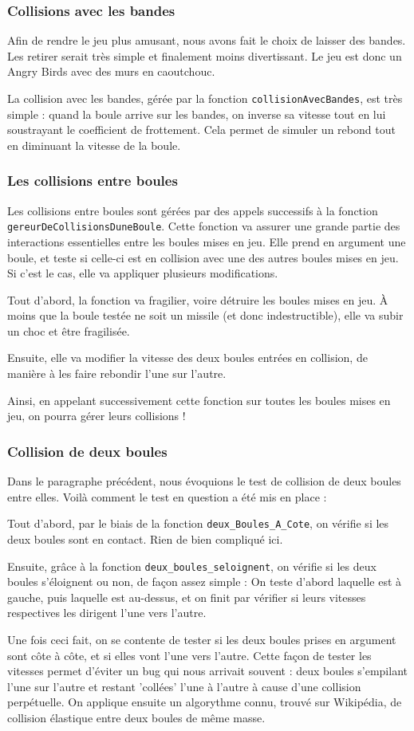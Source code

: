 \documentclass[10pt]{article}
\begin{document}
\subsubsection{Collisions avec les bandes}
Afin de rendre le jeu plus amusant, nous avons fait le choix de laisser des bandes. Les retirer serait très simple et finalement moins
divertissant. Le jeu est donc un Angry Birds avec des murs en caoutchouc.
\par La collision avec les bandes, gérée par la fonction \texttt{collisionAvecBandes}, est très simple : quand la boule arrive sur les bandes, on inverse sa vitesse tout en lui soustrayant
le coefficient de frottement. Cela permet de simuler un rebond tout en diminuant la vitesse de la boule.
\subsubsection{Les collisions entre boules}
Les collisions entre boules sont gérées par des appels successifs à la fonction \texttt{gereurDeCollisionsDuneBoule}. Cette fonction va
assurer une grande partie des interactions essentielles entre les boules mises en jeu. Elle prend en argument une boule, et teste si
celle-ci est en collision avec une des autres boules mises en jeu. Si c'est le cas, elle va appliquer plusieurs modifications.
\par Tout d'abord, la fonction va fragilier, voire détruire les boules mises en jeu. À moins que la boule testée ne soit un missile
(et donc indestructible), elle va subir un choc et être fragilisée.
\par Ensuite, elle va modifier la vitesse des deux boules entrées en collision, de manière à les faire rebondir l'une sur l'autre.
\par Ainsi, en appelant successivement cette fonction sur toutes les boules mises en jeu, on pourra gérer leurs collisions !
\subsubsection{Collision de deux boules}
Dans le paragraphe précédent, nous évoquions le test de collision de deux boules entre elles. Voilà comment le test en question a été mis en place :
\par Tout d'abord, par le biais de la fonction \texttt{deux\_Boules\_A\_Cote}, on vérifie si les deux boules sont en contact. Rien de bien compliqué ici.
\par Ensuite, grâce à la fonction \texttt{deux\_boules\_seloignent}, on vérifie si les deux boules s'éloignent ou non, de façon assez simple :
On teste d'abord laquelle est à gauche, puis laquelle est au-dessus, et on finit par vérifier si leurs vitesses respectives les dirigent l'une vers l'autre.
\par Une fois ceci fait, on se contente de tester si les deux boules prises en argument sont côte à côte, et si elles vont l'une vers l'autre.
Cette façon de tester les vitesses permet d'éviter un bug qui nous arrivait souvent : deux boules s'empilant l'une sur l'autre et restant 'collées' l'une à l'autre à cause d'une collision perpétuelle.
On applique ensuite un algorythme connu, trouvé sur Wikipédia, de collision élastique entre deux boules de même masse.
\end{document}
